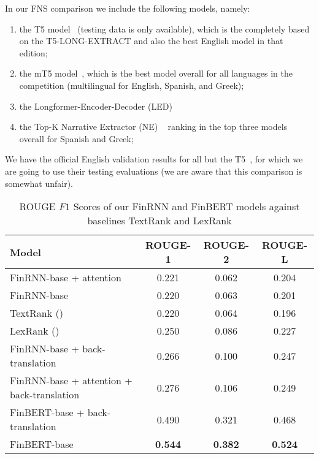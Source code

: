 In our FNS comparison we include the following models, namely:
\begin{enumerate}
    \item the T5 model~\cite{el-haj-etal-2022-financial} (testing data is only available), which is the completely based on the T5-LONG-EXTRACT and also the best English model in that edition;
    \item the mT5 model~\cite{foroutan-etal-2022-multilingual}, which is the best model overall for all languages in the competition (multilingual for English, Spanish, and Greek);
    \item the Longformer-Encoder-Decoder (LED)~\cite{khanna-etal-2022-transformer}
    \item the Top-K Narrative Extractor (NE) ~\cite{shukla-etal-2022-dimsum}  ranking in the top three models overall for Spanish and Greek;
\end{enumerate}
We have the official English validation results for all but the T5~\cite{el-haj-etal-2022-financial}, for which we are going to use their testing evaluations (we are aware that this comparison is somewhat unfair).

\begin{table}[ht]
    \centering
    \begin{tabular}{lccc}
        \toprule
        \textbf{Model} & \textbf{ROUGE-1} & \textbf{ROUGE-2} & \textbf{ROUGE-L} \\
        \midrule
            FinRNN-base + attention & 0.221 & 0.062 & 0.204 \\
            FinRNN-base & 0.220 & 0.063 & 0.201 \\
            TextRank (\cite{mihalcea-tarau-2004-textrank}) & 0.220 & 0.064 & 0.196 \\
            LexRank (\cite{Erkan2004LexRankGC}) & 0.250 & 0.086 & 0.227 \\
        \midrule
            FinRNN-base + back-translation & 0.266 & 0.100 & 0.247 \\
            FinRNN-base + attention + back-translation & 0.276 & 0.106 & 0.249 \\
            FinBERT-base + back-translation & 0.490 & 0.321 & 0.468 \\
            FinBERT-base & \textbf{0.544} & \textbf{0.382} & \textbf{0.524} \\
        \bottomrule
    \end{tabular}\caption{ROUGE $F1$ Scores of our FinRNN and FinBERT models against baselines TextRank and LexRank}
    \label{tab:rouge_performance_validation}
\end{table}

